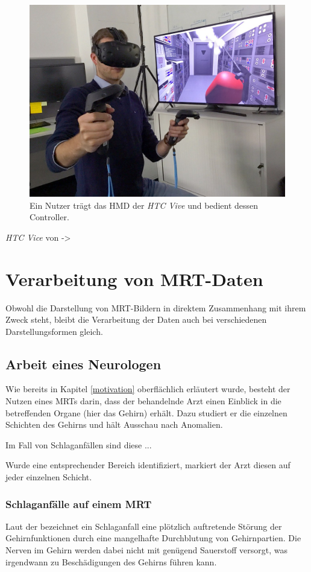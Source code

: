 \begin{figure}
	\centering
	\includegraphics[width=0.5\linewidth]{images/vive.jpg}
	\caption{Ein Nutzer trägt das HMD der \textit{HTC Vive} und bedient dessen Controller.}
	\label{img:vive}
\end{figure}

  
\textit{HTC Vice} von \citet{vive} -> 
\section{Verarbeitung von MRT-Daten}						 %
Obwohl die Darstellung von MRT-Bildern in direktem Zusammenhang mit ihrem Zweck steht, bleibt die Verarbeitung der Daten auch bei verschiedenen Darstellungsformen gleich. 

\subsection{Arbeit eines Neurologen}
Wie bereits in Kapitel \ref{motivation} oberflächlich erläutert wurde, besteht der Nutzen eines MRTs darin, dass der behandelnde Arzt einen Einblick in die betreffenden Organe (hier das Gehirn) erhält. Dazu studiert er die einzelnen Schichten des Gehirns und hält Ausschau nach Anomalien.

Im Fall von Schlaganfällen sind diese ...

Wurde eine entsprechender Bereich identifiziert, markiert der Arzt diesen auf jeder einzelnen Schicht. 
\subsubsection{Schlaganfälle auf einem MRT}

Laut der \citet{schlaganfall} bezeichnet ein Schlaganfall eine plötzlich auftretende Störung der Gehirnfunktionen durch eine mangelhafte Durchblutung von Gehirnpartien. Die Nerven im Gehirn werden dabei nicht mit genügend Sauerstoff versorgt, was irgendwann zu Beschädigungen des Gehirns führen kann.

